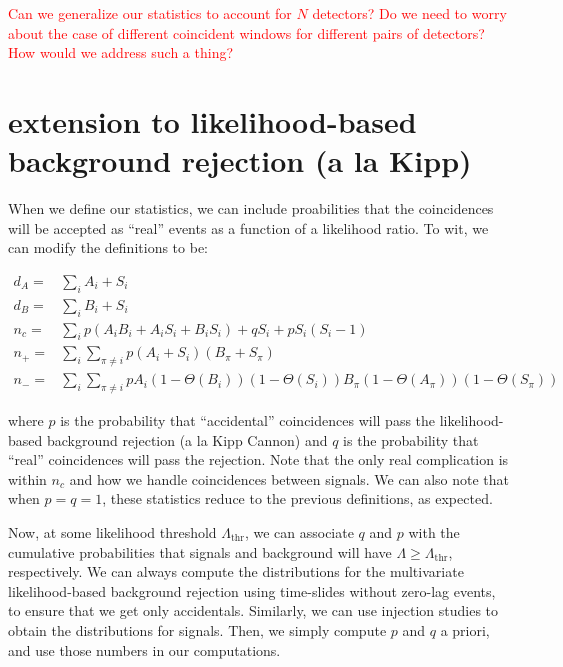 \documentclass{article}
\newcommand{\step}[1]{\Theta\left(#1\right)}
\begin{document}
\textcolor{red}{
Can we generalize our statistics to account for $N$ detectors?
Do we need to worry about the case of different coincident windows for different pairs of detectors?
How would we address such a thing?
}

\section{extension to likelihood-based background rejection (a la Kipp)}

When we define our statistics, we can include proabilities that the coincidences will be accepted as ``real'' events as a function of a likelihood ratio. 
To wit, we can modify the definitions to be:

\begin{subequations}
	\begin{align}
		d_A = & \sum_i A_i + S_i \\
		d_B = & \sum_i B_i + S_i \\
		n_c = & \sum_i p (A_i B_i + A_i S_i + B_i S_i) + q S_i + p S_i (S_i-1) \\
		n_+ = & \sum_i\sum_{\pi\neq i} p (A_i + S_i) (B_\pi + S_\pi) \\
		n_- = & \sum_i\sum_{\pi\neq i} p A_i (1-\step{B_i})(1-\step{S_i}) B_\pi (1-\step{A_\pi}) (1-\step{S_\pi})
	\end{align}
\end{subequations}

\noindent
where $p$ is the probability that ``accidental'' coincidences will pass the likelihood-based background rejection (a la Kipp Cannon) and $q$ is the probability that ``real'' coincidences will pass the rejection.
Note that the only real complication is within $n_c$ and how we handle coincidences between signals.
We can also note that when $p=q=1$, these statistics reduce to the previous definitions, as expected.

Now, at some likelihood threshold $\Lambda_\mathrm{thr}$, we can associate $q$ and $p$ with the cumulative probabilities that signals and background will have $\Lambda\geq\Lambda_\mathrm{thr}$, respectively.
We can always compute the distributions for the multivariate likelihood-based background rejection using time-slides without zero-lag events, to ensure that we get only accidentals.
Similarly, we can use injection studies to obtain the distributions for signals. 
Then, we simply compute $p$ and $q$ a priori, and use those numbers in our computations.
\end{document}
